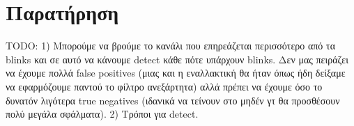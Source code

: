 \documentclass[12pt]{article} %
\begin{document}
\section*{Παρατήρηση}
TODO: 
1) Μπορούμε να βρούμε το κανάλι που επηρεάζεται περισσότερο από τα blinks και σε αυτό να κάνουμε detect κάθε πότε υπάρχουν blinks. Δεν μας πειράζει να έχουμε πολλά false positives (μιας και η εναλλακτική θα ήταν όπως ήδη δείξαμε να εφαρμόζουμε παντού το φίλτρο ανεξάρτητα) αλλά πρέπει να έχουμε όσο το δυνατόν λιγότερα true negatives (ιδανικά να τείνουν στο μηδέν γτ θα προσθέσουν πολύ μεγάλα σφάλματα). 
2) Τρόποι για detect.
\end{document}
